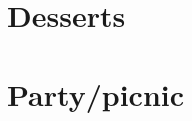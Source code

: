 \documentclass[%
twoside,
11pt
]{article}
\begin{document}
\section{Desserts}

\newpage

\newpage

\newpage

\newpage

\newpage

\newpage

\newpage

\newpage


\section{Party/picnic}


\newpage

\newpage

\newpage

\newpage

\newpage
\end{document}
